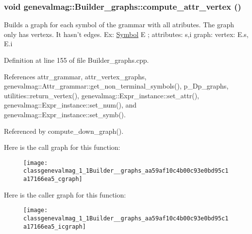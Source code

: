 \hypertarget{classgenevalmag_1_1Builder__graphs_aa59af10c4b00c93e0bd95c1a17166ea5}{
\subsubsection[{compute\_\-attr\_\-vertex}]{\setlength{\rightskip}{0pt plus 5cm}void genevalmag::Builder\_\-graphs::compute\_\-attr\_\-vertex ()}}
\label{classgenevalmag_1_1Builder__graphs_aa59af10c4b00c93e0bd95c1a17166ea5}
Builds a graph for each symbol of the grammar with all atributes. The graph only has vertexs. It hasn't edges. Ex: \hyperlink{classgenevalmag_1_1Symbol}{Symbol} E ; attributes: s,i graph: vertex: E.s, E.i 

Definition at line 155 of file Builder\_\-graphs.cpp.



References attr\_\-grammar, attr\_\-vertex\_\-graphs, genevalmag::Attr\_\-grammar::get\_\-non\_\-terminal\_\-symbols(), p\_\-Dp\_\-graphs, utilities::return\_\-vertex(), genevalmag::Expr\_\-instance::set\_\-attr(), genevalmag::Expr\_\-instance::set\_\-num(), and genevalmag::Expr\_\-instance::set\_\-symb().



Referenced by compute\_\-down\_\-graph().



Here is the call graph for this function:\nopagebreak
\begin{figure}[H]
\begin{center}
\leavevmode
\texttt{[image: classgenevalmag\_1\_1Builder\_\_graphs\_aa59af10c4b00c93e0bd95c1a17166ea5\_cgraph]}
\end{center}
\end{figure}




Here is the caller graph for this function:\nopagebreak
\begin{figure}[H]
\begin{center}
\leavevmode
\texttt{[image: classgenevalmag\_1\_1Builder\_\_graphs\_aa59af10c4b00c93e0bd95c1a17166ea5\_icgraph]}
\end{center}
\end{figure}


